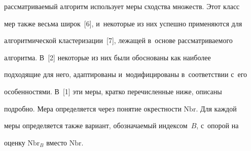 рас\-смат\-ри\-ва\-емый алгоритм использует меры сходства множеств. Этот класс 


мер также весьма широк~[6], и~некоторые из них успешно применяются для 


алгоритмической клас\-те\-ри\-за\-ции~[7], лежащей в~основе рас\-смат\-ри\-ва\-емо\-го 


алгоритма. В~[2] некоторые из них были обоснованы как наиболее 


подходящие для него, адап\-ти\-ро\-ва\-ны и~модифицированы в~соответствии с~его 


особенностями. В~[1] эти меры, кратко пе\-ре\-чис\-лен\-ные ниже, описаны 


подробно. Мера определяется через понятие окрест\-ности $\mathrm{Nbr}$. Для каж\-дой 


меры определяется так\-же вариант, обозна\-ча\-емый индексом~$B$, с~опорой на 


оценку $\mathrm{Nbr}_B$ вмес\-то $\mathrm{Nbr}$. 


